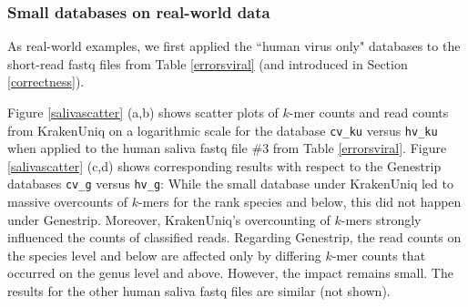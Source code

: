 \documentclass[pdflatex,sn-vancouver-num]{sn-jnl}
\begin{document}
\subsubsection{Small databases on real-world data}
\label{smalldbreal}

As real-world examples, we first applied the ``human virus only"  databases to the short-read fastq files from Table \ref{errorsviral} (and introduced in Section \ref{correctness}).       

    Figure \ref{salivascatter} (a,b) shows scatter plots of $k$-mer counts and read counts from KrakenUniq on a logarithmic scale for the database \texttt{cv\_ku} versus \texttt{hv\_ku} when applied to the human saliva fastq file \#3 from Table \ref{errorsviral}.
    Figure \ref{salivascatter} (c,d) shows corresponding results with respect to the Genestrip databases \texttt{cv\_g} versus \texttt{hv\_g}: While the small database under KrakenUniq led to massive overcounts of $k$-mers for the rank species and below, this did not happen under Genestrip. Moreover, KrakenUniq's overcounting of $k$-mers strongly influenced the counts of classified reads. Regarding Genestrip, the read counts on the species level and below are affected only by differing $k$-mer counts that occurred on the genus level and above. However, the impact remains small. The results for the other human saliva fastq files are similar (not shown).
\end{document}
